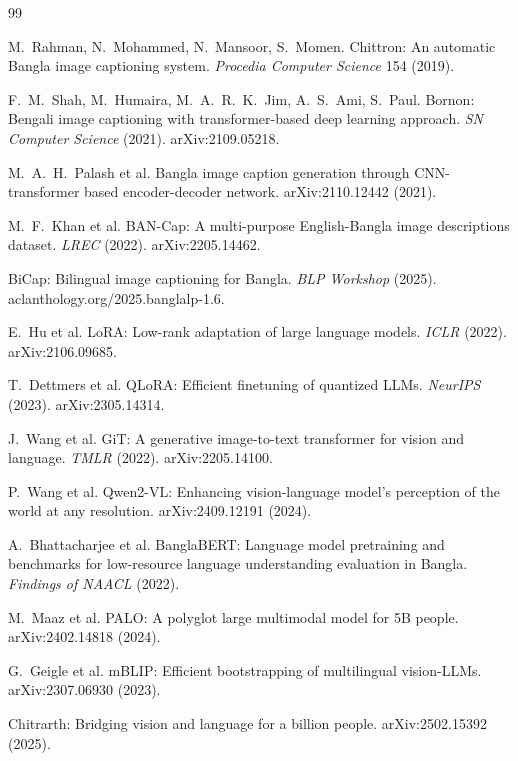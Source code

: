 \documentclass[11pt]{article}
\begin{document}
\begin{thebibliography}{99}
\small

 M.~Rahman, N.~Mohammed, N.~Mansoor, S.~Momen.
Chittron: An automatic Bangla image captioning system.
\emph{Procedia Computer Science} 154 (2019).

 F.~M.~Shah, M.~Humaira, M.~A.~R.~K.~Jim,
A.~S.~Ami, S.~Paul. Bornon: Bengali image captioning with
transformer-based deep learning approach. \emph{SN Computer Science}
(2021). arXiv:2109.05218.

 M.~A.~H.~Palash et al. Bangla image caption
generation through CNN-transformer based encoder-decoder network.
arXiv:2110.12442 (2021).

 M.~F.~Khan et al. BAN-Cap: A multi-purpose
English-Bangla image descriptions dataset. \emph{LREC} (2022).
arXiv:2205.14462.

 BiCap: Bilingual image captioning for Bangla.
\emph{BLP Workshop} (2025). aclanthology.org/2025.banglalp-1.6.

 E.~Hu et al. LoRA: Low-rank adaptation of large
language models. \emph{ICLR} (2022). arXiv:2106.09685.

 T.~Dettmers et al. QLoRA: Efficient finetuning of
quantized LLMs. \emph{NeurIPS} (2023). arXiv:2305.14314.

 J.~Wang et al. GiT: A generative image-to-text
transformer for vision and language. \emph{TMLR} (2022).
arXiv:2205.14100.

 P.~Wang et al. Qwen2-VL: Enhancing
vision-language model's perception of the world at any resolution.
arXiv:2409.12191 (2024).

 A.~Bhattacharjee et al. BanglaBERT: Language
model pretraining and benchmarks for low-resource language
understanding evaluation in Bangla. \emph{Findings of NAACL} (2022).

 M.~Maaz et al. PALO: A polyglot large multimodal
model for 5B people. arXiv:2402.14818 (2024).

 G.~Geigle et al. mBLIP: Efficient bootstrapping of
multilingual vision-LLMs. arXiv:2307.06930 (2023).

 Chitrarth: Bridging vision and language for a
billion people. arXiv:2502.15392 (2025).


\end{thebibliography}
\end{document}

